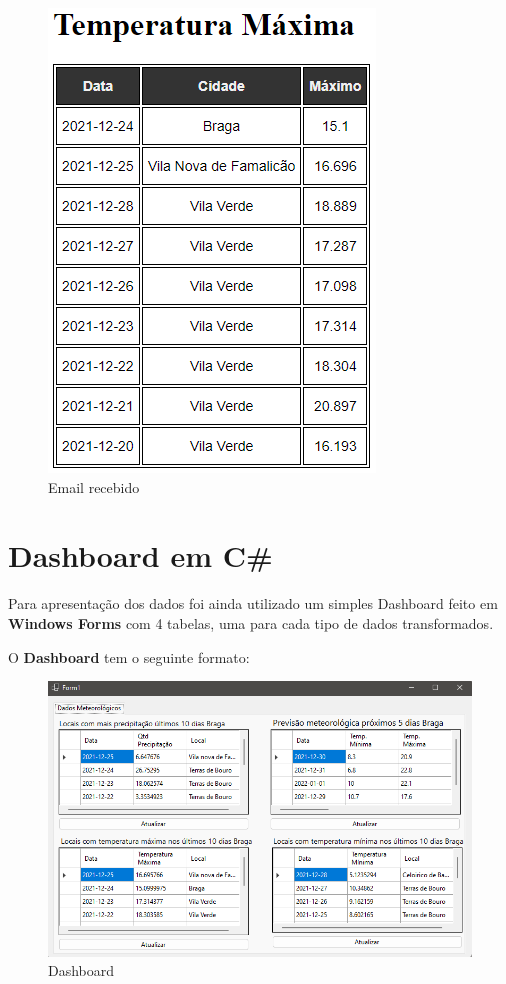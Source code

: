 \begin{figure}[H]
    \includegraphics[scale=0.7]{imagens-spoon/emai_temp_max.png}
    \caption{Email recebido}
\end{figure}

\section*{Dashboard em C\#}
Para apresentação dos dados foi ainda utilizado um simples Dashboard feito em \textbf{Windows Forms} com 4 tabelas, uma para cada tipo de dados transformados.

O \textbf{Dashboard} tem o seguinte formato:

\begin{figure}[H]
    \centering
    \includegraphics[scale=0.7]{imagens/Forms.png}
    \caption{Dashboard}
\end{figure}


